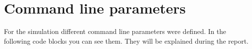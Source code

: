 \section{Command line parameters}

For the simulation different command line parameters were defined.
In the following code blocks you can see them.
They will be explained during the report.


